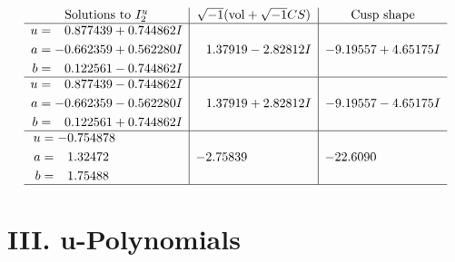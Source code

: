 \documentclass[1p]{elsarticle_modified}
\theoremstyle{definition}
\newcommand{\I}{\sqrt{-1}}
\begin{document}
$$\begin{array}{c|c|c}  
\text{Solutions to }I^u_{2}& \I (\text{vol} + \sqrt{-1}CS) & \text{Cusp shape}\\
 \hline 
\begin{aligned}
u &= \phantom{-}0.877439 + 0.744862 I \\
a &= -0.662359 + 0.562280 I \\
b &= \phantom{-}0.122561 - 0.744862 I\end{aligned}
 & \phantom{-}1.37919 - 2.82812 I & -9.19557 + 4.65175 I \\ \hline\begin{aligned}
u &= \phantom{-}0.877439 - 0.744862 I \\
a &= -0.662359 - 0.562280 I \\
b &= \phantom{-}0.122561 + 0.744862 I\end{aligned}
 & \phantom{-}1.37919 + 2.82812 I & -9.19557 - 4.65175 I \\ \hline\begin{aligned}
u &= -0.754878\phantom{ +0.000000I} \\
a &= \phantom{-}1.32472\phantom{ +0.000000I} \\
b &= \phantom{-}1.75488\phantom{ +0.000000I}\end{aligned}
 & -2.75839\phantom{ +0.000000I} & -22.6090\phantom{ +0.000000I}\\
 \hline 
 \end{array}$$\newpage
\newpage\renewcommand{\arraystretch}{1}
\centering \section*{ III. u-Polynomials}
\end{document}

